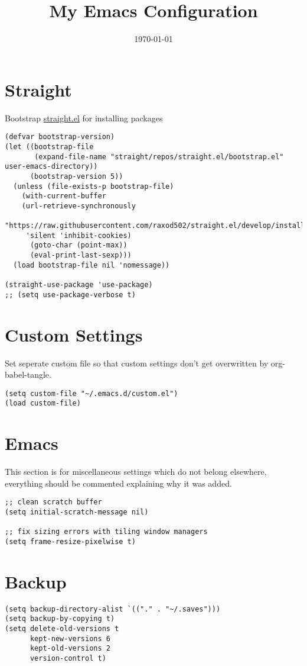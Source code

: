 \documentclass[11pt]{article}
\date{\today}
\title{My Emacs Configuration}
\begin{document}
\maketitle
\tableofcontents


\section{Straight}
\label{sec:org0ab500b}
Bootstrap \href{https://github.com/raxod502/straight.el}{straight.el} for installing packages
\begin{verbatim}
(defvar bootstrap-version)
(let ((bootstrap-file
       (expand-file-name "straight/repos/straight.el/bootstrap.el" user-emacs-directory))
      (bootstrap-version 5))
  (unless (file-exists-p bootstrap-file)
    (with-current-buffer
	(url-retrieve-synchronously
	 "https://raw.githubusercontent.com/raxod502/straight.el/develop/install.el"
	 'silent 'inhibit-cookies)
      (goto-char (point-max))
      (eval-print-last-sexp)))
  (load bootstrap-file nil 'nomessage))

(straight-use-package 'use-package)
;; (setq use-package-verbose t)
\end{verbatim}
\section{Custom Settings}
\label{sec:orgbea1252}
Set seperate custom file so that custom settings don't get overwritten by org-babel-tangle.
\begin{verbatim}
(setq custom-file "~/.emacs.d/custom.el")
(load custom-file)
\end{verbatim}
\section{Emacs}
\label{sec:orgada5592}
This section is for miscellaneous settings which do not belong elsewhere, everything should be commented explaining why it was added.
\begin{verbatim}
;; clean scratch buffer
(setq initial-scratch-message nil)

;; fix sizing errors with tiling window managers
(setq frame-resize-pixelwise t)
\end{verbatim}

\section{Backup}
\label{sec:org7ed0ade}
\begin{verbatim}
(setq backup-directory-alist `(("." . "~/.saves")))
(setq backup-by-copying t)
(setq delete-old-versions t
      kept-new-versions 6
      kept-old-versions 2
      version-control t)
\end{verbatim}
\end{document}
